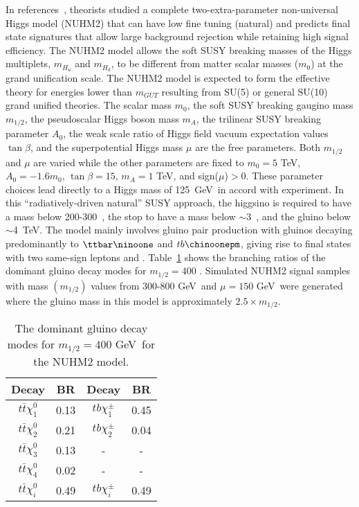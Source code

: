 In references~\cite{Baer:2013xua,Baer:2013yha,Baer:2016usl}, 
theorists studied a complete two-extra-parameter non-universal Higgs model (NUHM2) 
that can have low fine tuning (natural) and
predicts final state signatures that allow large background rejection while retaining high 
signal efficiency. 
The NUHM2 model allows the soft SUSY breaking masses of the Higgs multiplets, $m_{H_{u}}$ and $m_{H_{d}}$, to be different from 
matter scalar masses ($m_{0}$) at the grand unification scale. The NUHM2 model is expected to form the effective theory for energies 
lower than $m_{GUT}$ resulting from SU(5) or general SU(10) grand unified theories.
The scalar mass $m_{0}$, the soft SUSY breaking gaugino mass $m_{1/2}$, the pseudoscalar Higgs boson mass $m_{A}$, the trilinear SUSY breaking parameter $A_{0}$, the weak scale ratio of Higgs field vacuum expectation values $\tan\beta$, and the superpotential Higgs mass $\mu$ are the free parameters.
Both $m_{1/2}$ and $\mu$ are varied while the other parameters are fixed to $m_{0} = 5$ TeV, $A_{0} = -1.6m_{0}$, $\tan\beta = 15$, $m_{A} = 1$ TeV, and sign($\mu$)$>$0. 
These parameter choices lead directly to a Higgs mass of 125~GeV~in accord with experiment.  In this ``radiatively-driven natural'' SUSY approach, the higgsino is
required to have a mass below 200-300~\GeV, the stop to have a mass below
$\sim$3~\TeV, and the gluino below $\sim$4~TeV.
The model mainly involves gluino pair production with gluinos decaying 
predominantly to $\ttbar\ninoone$ and $tb\chinoonepm$, giving rise to final 
states with two same-sign leptons and \met.
Table~\ref{tab:NUHM2} shows the branching ratios of the dominant gluino decay modes for $m_{1/2} = 400$ \GeV.
Simulated NUHM2 signal samples with mass $(m_{1/2})$ values from 300-800 GeV~and $\mu = 150$ GeV~were generated where 
the gluino mass in this model is approximately $2.5\times m_{1/2}$.

\begin{table}[t!]
\begin{center}
\begin{tabular}{|c|c||c|c|}
\hline
\hline
Decay & BR & Decay & BR\\
\hline
$t\bar{t}\chi^{0}_{1}$ & 0.13 & $tb\chi^{\pm}_{1}$ & 0.45\\
$t\bar{t}\chi^{0}_{2}$ & 0.21 & $tb\chi^{\pm}_{2}$ & 0.04\\
$t\bar{t}\chi^{0}_{3}$ & 0.13 & - & - \\
$t\bar{t}\chi^{0}_{4}$ & 0.02 & - & - \\
\hline
$t\bar{t}\chi^{0}_{i}$ & 0.49 & $tb\chi^{\pm}_{i}$ & 0.49\\
\hline
\hline
\end{tabular}
\caption{The dominant gluino decay modes for $m_{1/2} = 400$ GeV~for the NUHM2 model.}
\label{tab:NUHM2}
\end{center}
\end{table}

